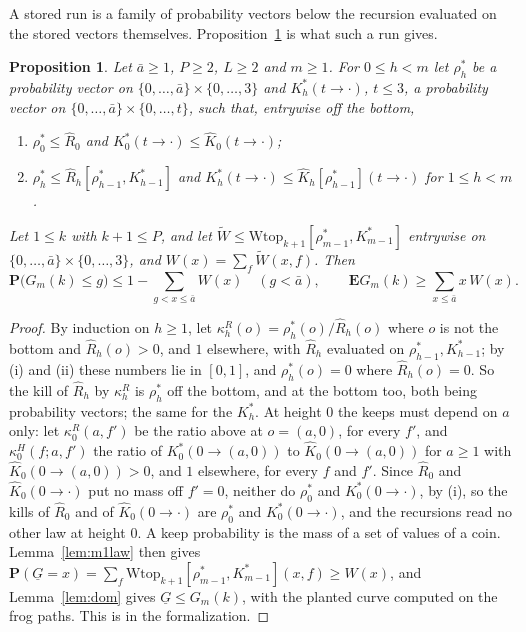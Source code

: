 \documentclass[11pt]{amsart}
\newtheorem{proposition}[theorem]{Proposition}
\theoremstyle{definition}
\numberwithin{equation}{section}
\newcommand{\lean}[1]{\ignorespaces}
\newcommand{\E}{\mathbf{E}}
\renewcommand{\P}{\mathbf{P}}
\begin{document}
A stored run is a family of probability vectors below the recursion evaluated on the stored vectors themselves. Proposition~\ref{prop:F3} is what such a run gives.

\begin{proposition}\label{prop:F3}\lean{FrogModel.D3.f3L_holds, FrogModel.D3.Iface.f3L, FrogModel.D3.Iface.F3Hyp, FrogModel.D3.Iface.Wtop, FrogModel.D3.Iface.Wrec, FrogModel.D3.Iface.Yrec, FrogModel.D3.Iface.KhatH, FrogModel.D3.Iface.Rhat, FrogModel.D3.Iface.Rhat0, FrogModel.D3.Iface.Khat0}
Let $\bar a\ge1$, $P\ge2$, $L\ge2$ and $m\ge1$. For $0\le h<m$ let $\rho^*_h$ be a probability vector on $\{0,\dots,\bar a\}\times\{0,\dots,3\}$ and $K^*_h(t\to\cdot)$, $t\le3$, a probability vector on $\{0,\dots,\bar a\}\times\{0,\dots,t\}$, such that, entrywise off the bottom,
\begin{enumerate}
\item[(i)] $\rho^*_0\le\widehat R_0$ and $K^*_0(t\to\cdot)\le\widehat K_0(t\to\cdot)$;
\item[(ii)] $\rho^*_h\le\widehat R_h[\rho^*_{h-1},K^*_{h-1}]$ and $K^*_h(t\to\cdot)\le\widehat K_h[\rho^*_{h-1}](t\to\cdot)$ for $1\le h<m$.
\end{enumerate}
Let $1\le k$ with $k+1\le P$, and let $\widetilde W\le\mathrm{Wtop}_{k+1}[\rho^*_{m-1},K^*_{m-1}]$ entrywise on $\{0,\dots,\bar a\}\times\{0,\dots,3\}$, and $W(x)=\sum_f\widetilde W(x,f)$. Then
\[
\P\bigl(G_m(k)\le g\bigr)\le1-\sum_{g<x\le \bar a}W(x)\quad(g<\bar a),\qquad\E G_m(k)\ge\sum_{x\le \bar a}x\,W(x). %
\]
\end{proposition}

\begin{proof}
By induction on $h\ge1$, let $\kappa^R_h(o)=\rho^*_h(o)/\widehat R_h(o)$ where $o$ is not the bottom and $\widehat R_h(o)>0$, and $1$ elsewhere, with $\widehat R_h$ evaluated on $\rho^*_{h-1},K^*_{h-1}$; by (i) and (ii) these numbers lie in $[0,1]$, and $\rho^*_h(o)=0$ where $\widehat R_h(o)=0$. So the kill of $\widehat R_h$ by $\kappa^R_h$ is $\rho^*_h$ off the bottom, and at the bottom too, both being probability vectors; the same for the $K^*_h$. At height $0$ the keeps must depend on $a$ only: let $\kappa^R_0(a,f')$ be the ratio above at $o=(a,0)$, for every $f'$, and $\kappa^H_0(f;a,f')$ the ratio of $K^*_0(0\to(a,0))$ to $\widehat K_0(0\to(a,0))$ for $a\ge1$ with $\widehat K_0(0\to(a,0))>0$, and $1$ elsewhere, for every $f$ and $f'$. Since $\widehat R_0$ and $\widehat K_0(0\to\cdot)$ put no mass off $f'=0$, neither do $\rho^*_0$ and $K^*_0(0\to\cdot)$, by (i), so the kills of $\widehat R_0$ and of $\widehat K_0(0\to\cdot)$ are $\rho^*_0$ and $K^*_0(0\to\cdot)$, and the recursions read no other law at height $0$. A keep probability is the mass of a set of values of a coin. Lemma~\ref{lem:m1law} then gives $\P(\underline G=x)=\sum_f\mathrm{Wtop}_{k+1}[\rho^*_{m-1},K^*_{m-1}](x,f)\ge W(x)$, and Lemma~\ref{lem:dom} gives $\underline G\le G_m(k)$, with the planted curve computed on the frog paths. This is  in the formalization.
\end{proof}
\end{document}
